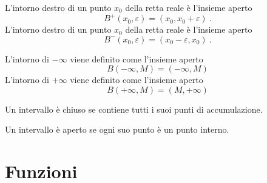 \begin{definition} L'intorno destro di un punto $x_0$ della retta reale è l'insieme aperto
    \begin{equation}
        B^+(x_0,\varepsilon) = (x_0, x_0+\varepsilon) \ .
    \end{equation}
L'intorno destro di un punto $x_0$ della retta reale è l'insieme aperto
    \begin{equation}
        B^-(x_0,\varepsilon) = (x_0-\varepsilon, x_0) \ .
    \end{equation}
\end{definition}
\begin{definition}
L'intorno di $-\infty$ viene definito come l'insieme aperto
    \begin{equation}
        B(-\infty,M) = (-\infty,M)
    \end{equation}
L'intorno di $+\infty$ viene definito come l'insieme aperto
    \begin{equation}
        B(+\infty,M) = (M,+\infty)
    \end{equation}
\end{definition}

\begin{definition} 
\end{definition}
\begin{definition}
\end{definition}

\begin{definition} {\color{red} Un intervallo è chiuso se contiene tutti i suoi punti di accumulazione.}
\end{definition}
\begin{definition} {\color{red} Un intervallo è aperto se ogni suo punto è un punto interno.}
\end{definition}

\begin{definition}[]
\end{definition}

\section{Funzioni}
\begin{definition}
\end{definition}

